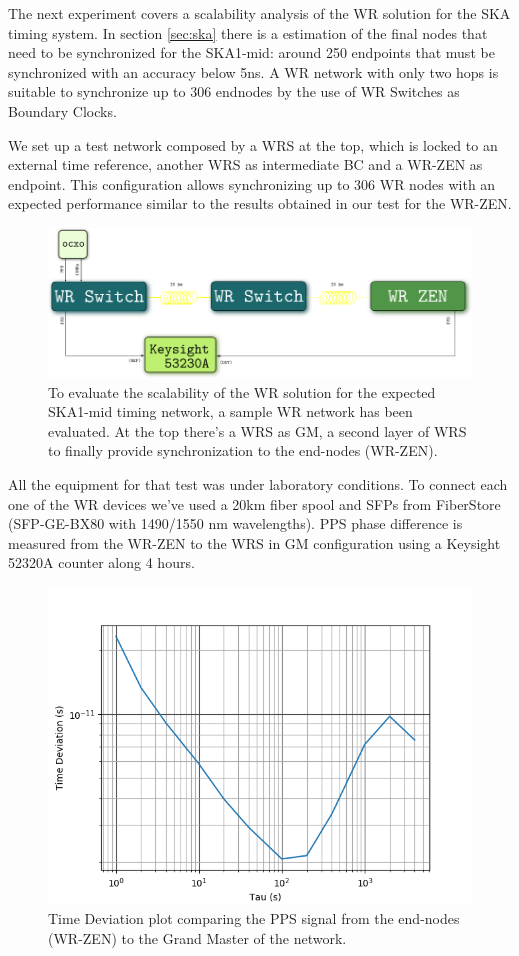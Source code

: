 The next experiment covers a scalability analysis of the WR solution for the 
SKA timing system. In section \ref{sec:ska} there is a estimation of the final 
nodes that need to be synchronized for the SKA1-mid: around 250 endpoints that 
must be synchronized with an accuracy below 5ns. A WR network with only two 
hops is suitable to synchronize up to 306 endnodes by the use of WR Switches as 
Boundary Clocks.

We set up a test network composed by a WRS at the top, which is locked to an 
external time reference, another WRS as intermediate BC and a WR-ZEN as 
endpoint. This configuration allows synchronizing up to 306 WR nodes with an 
expected performance similar to the results obtained in our test for the WR-ZEN.

\begin{figure}
	\centering
	\includegraphics[width=0.7\linewidth]{img/prueba_red}
	\caption[WR Scalability test's setup for SKA]{To evaluate the scalability 
	of the WR solution for the expected SKA1-mid timing network, a sample WR 
	network has been evaluated. At the top there's a WRS as GM, a second layer 
	of WRS to finally provide synchronization to the end-nodes (WR-ZEN).}
	\label{fig:pruebared}
\end{figure}


All the equipment for that test was under laboratory conditions. To connect 
each one of the WR devices we've used a 20km fiber spool and SFPs from 
FiberStore (SFP-GE-BX80 with 1490/1550 nm wavelengths). PPS phase difference is 
measured from the WR-ZEN to the WRS in GM configuration using a Keysight 52320A 
counter along 4 hours.

\begin{figure}
	\centering
	\includegraphics[width=0.9\linewidth]{img/tdev_exp3}
	\caption[TDEV of the end-nodes in the scalability test.]{Time Deviation 
	plot comparing the PPS signal from the end-nodes (WR-ZEN) to the Grand 
	Master of the network.}
	\label{fig:tdevnet}
\end{figure}

